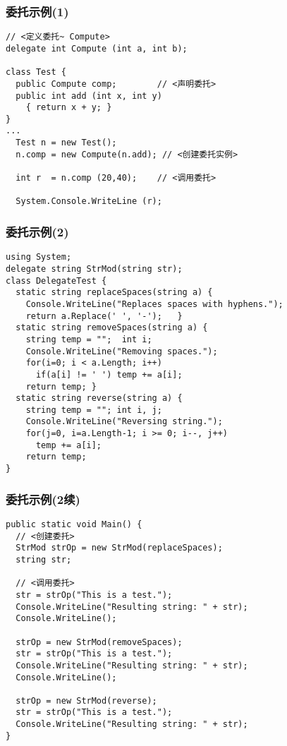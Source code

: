 \begin{frame}[fragile]
\frametitle{委托示例(1)}
\begin{lstlisting}[escapeinside=<>]
// <定义委托~ Compute>
delegate int Compute (int a, int b);

class Test {
  public Compute comp;        // <声明委托>
  public int add (int x, int y)
    { return x + y; }
}
...
  Test n = new Test();
  n.comp = new Compute(n.add); // <创建委托实例>

  int r  = n.comp (20,40);    // <调用委托>

  System.Console.WriteLine (r);
\end{lstlisting}

\end{frame}

\begin{frame}[fragile]
\frametitle{委托示例(2)}
\begin{lstlisting}
using System;
delegate string StrMod(string str);
class DelegateTest {
  static string replaceSpaces(string a) {
    Console.WriteLine("Replaces spaces with hyphens.");
    return a.Replace(' ', '-');   }
  static string removeSpaces(string a) {
    string temp = "";  int i;
    Console.WriteLine("Removing spaces.");
    for(i=0; i < a.Length; i++)
      if(a[i] != ' ') temp += a[i];
    return temp; }
  static string reverse(string a) {
    string temp = ""; int i, j;
    Console.WriteLine("Reversing string.");
    for(j=0, i=a.Length-1; i >= 0; i--, j++)
      temp += a[i];
    return temp;
}
\end{lstlisting}
\end{frame}
\begin{frame}[fragile]
\frametitle{委托示例(2续)}
\begin{lstlisting}[escapeinside=<>]
public static void Main() {
  // <创建委托>
  StrMod strOp = new StrMod(replaceSpaces);
  string str;

  // <调用委托>
  str = strOp("This is a test.");
  Console.WriteLine("Resulting string: " + str);
  Console.WriteLine();

  strOp = new StrMod(removeSpaces);
  str = strOp("This is a test.");
  Console.WriteLine("Resulting string: " + str);
  Console.WriteLine();

  strOp = new StrMod(reverse);
  str = strOp("This is a test.");
  Console.WriteLine("Resulting string: " + str);
}

\end{lstlisting}
\end{frame}

